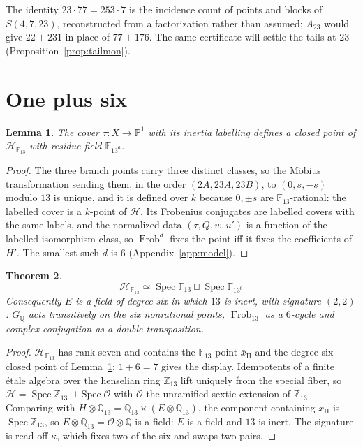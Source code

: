 \documentclass[11pt]{amsart}
\newcommand{\QQ}{\mathbb{Q}}
\newcommand{\ZZ}{\mathbb{Z}}
\newcommand{\FF}{\mathbb{F}}
\newcommand{\PP}{\mathbb{P}}
\newcommand{\GQ}{G_{\QQ}}
\newcommand{\kap}{\kappa}
\newcommand{\Frob}{\operatorname{Frob}}
\newcommand{\Spec}{\operatorname{Spec}}
\newcommand{\Hs}{\mathscr H}
\newcommand{\xH}{x_{\mathrm H}}
\theoremstyle{plain}
\newtheorem{theorem}{Theorem}[section]
\newtheorem{lemma}[theorem]{Lemma}
\theoremstyle{definition}
\begin{document}
The identity $23\cdot77=253\cdot7$ is the incidence count of points
and blocks of $S(4,7,23)$, reconstructed from a factorization rather
than assumed; $A_{23}$ would give $22+231$ in place of $77+176$. The
same certificate will settle the tails at $23$
(Proposition~\ref{prop:tailmon}).

\section{One plus six}\label{sec:onesix}

\begin{lemma}\label{lem:moduli}
The cover $\tau\colon X\to\PP^1$ with its inertia labelling defines a
closed point of $\Hs_{\FF_{13}}$ with residue field $\FF_{13^6}$.
\end{lemma}
\begin{proof}
The three branch points carry three distinct classes, so the M\"obius
transformation sending them, in the order $(2A,23A,23B)$, to $(0,s,-s)$
modulo $13$ is unique, and it is defined over $k$ because $0,\pm s$
are $\FF_{13}$-rational: the labelled cover is a $k$-point of $\Hs$.
Its Frobenius conjugates are labelled covers with the same labels, and
the normalized data $(\tau,Q,w,u')$ is a function of the labelled
isomorphism class, so $\Frob^d$ fixes the point iff it fixes the
coefficients of $H'$. The smallest such $d$ is $6$
(Appendix~\ref{app:model}).
\end{proof}

\begin{theorem}\label{thm:onesix}
\[
  \boxed{\ \Hs_{\FF_{13}}\simeq\Spec\FF_{13}\sqcup\Spec\FF_{13^6}\ }
\]
Consequently $E$ is a field of degree six in which $13$ is inert, with
signature $(2,2)$: $\GQ$ acts transitively on the six nonrational
points, $\Frob_{13}$ as a $6$-cycle and complex conjugation as a
double transposition.
\end{theorem}
\begin{proof}
$\Hs_{\FF_{13}}$ has rank seven and contains the $\FF_{13}$-point
$\bar x_{\mathrm H}$ and the degree-six closed point of
Lemma~\ref{lem:moduli}; $1+6=7$ gives the display. Idempotents of a
finite \'etale algebra over the henselian ring $\ZZ_{13}$ lift
uniquely from the special fiber, so
$\Hs=\Spec\ZZ_{13}\sqcup\Spec\mathcal O$ with $\mathcal O$ the
unramified sextic extension of $\ZZ_{13}$. Comparing with
$H\otimes\QQ_{13}=\QQ_{13}\times(E\otimes\QQ_{13})$, the component
containing $\xH$ is $\Spec\ZZ_{13}$, so
$E\otimes\QQ_{13}=\mathcal O\otimes\QQ$ is a field: $E$ is a field and
$13$ is inert. The signature is read off $\kap$, which fixes two of
the six and swaps two pairs.
\end{proof}
\end{document}
